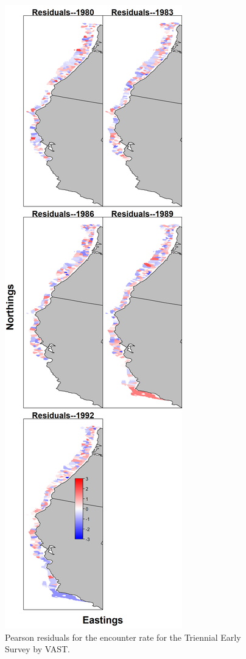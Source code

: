 \documentclass[12pt,]{article}
\begin{document}
\FloatBarrier

\begin{figure}
\centering
\includegraphics{Figures/tri_early_maps--encounter_pearson_resid.png}
\caption{Pearson residuals for the encounter rate for the Triennial
Early Survey by VAST. \label{fig:tri_early_enc_rate}}
\end{figure}
\end{document}
